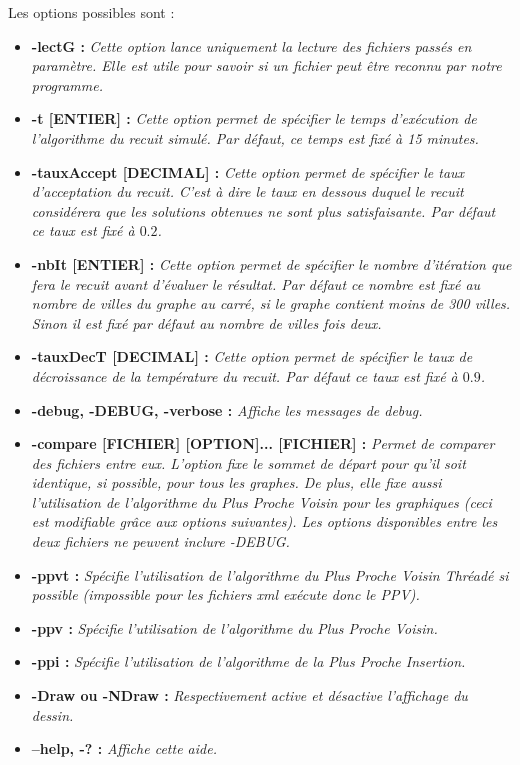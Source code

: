 \documentclass{article}
\begin{document}
Les options possibles sont :\smallskip
\begin{itemize}
\item \textbf{-lectG :} \emph{Cette option lance uniquement la lecture des fichiers passés en paramètre. Elle est utile pour savoir si un fichier peut être reconnu par notre programme.}\smallskip

\item \textbf{-t [ENTIER] :} \emph{Cette option permet de spécifier le temps d'exécution de l'algorithme du recuit simulé. Par défaut, ce temps est fixé à 15 minutes.}\smallskip

\item \textbf{-tauxAccept [DECIMAL] :} \emph{Cette option permet de spécifier le taux d'acceptation du recuit. C'est à dire le taux en dessous duquel le recuit considérera que les solutions obtenues ne sont plus satisfaisante. Par défaut ce taux est fixé à $0.2$.}\smallskip

\item \textbf{-nbIt [ENTIER] :} \emph{Cette option permet de spécifier le nombre d'itération que fera le recuit avant d'évaluer le résultat. Par défaut ce nombre est fixé au nombre de villes du graphe au carré, si le graphe contient moins de 300 villes. Sinon il est fixé par défaut au nombre de villes fois deux.}\smallskip

\item \textbf{-tauxDecT [DECIMAL] :} \emph{Cette option permet de spécifier le taux de décroissance de la température du recuit. Par défaut ce taux est fixé à $0.9$.}\smallskip

\item \textbf{-debug, -DEBUG, -verbose :} \emph{Affiche les messages de debug.}\smallskip

\item \textbf{-compare [FICHIER] [OPTION]... [FICHIER] :} \emph{
Permet de comparer des fichiers entre eux. L'option fixe le sommet de départ pour qu'il soit identique, si possible, pour tous les graphes.
De plus, elle fixe aussi l'utilisation de l'algorithme du Plus Proche Voisin pour les graphiques (ceci est modifiable grâce aux options suivantes).
Les options disponibles entre les deux fichiers ne peuvent inclure -DEBUG.}\smallskip

\item \textbf{-ppvt :} \emph{Spécifie l'utilisation de l'algorithme du Plus Proche Voisin Thréadé si possible (impossible pour les fichiers xml exécute donc le PPV).}\smallskip

\item \textbf{-ppv :} \emph{Spécifie l'utilisation de l'algorithme du Plus Proche Voisin.}\smallskip

\item \textbf{-ppi :} \emph{Spécifie l'utilisation de l'algorithme de la Plus Proche Insertion.}\smallskip

\item \textbf{-Draw ou -NDraw :} \emph{Respectivement active et désactive l'affichage du dessin.}\smallskip

\item \textbf{--help, -? :} \emph{Affiche cette aide.}
\end{itemize}															
							
\end{document}
